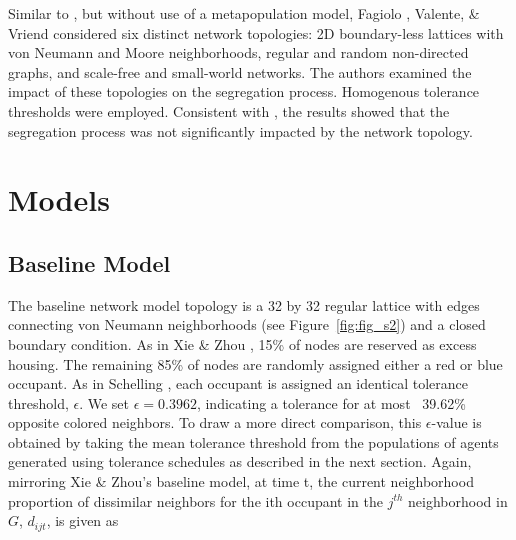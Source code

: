 \documentclass[a4paper]{article}
\begin{document}
Similar to \cite{GargiuloFloriana2015UsfS}, but without use of a metapopulation model, Fagiolo , Valente, \& Vriend \cite{FagioloGiorgio2007Sin} considered six distinct network topologies: 2D boundary-less lattices with von Neumann and Moore neighborhoods, regular and random non-directed graphs, and scale-free and small-world networks. The authors examined the impact of these topologies on the segregation process. Homogenous tolerance thresholds were employed. Consistent with \cite{GargiuloFloriana2015UsfS}, the results showed that the segregation process was not significantly impacted by the network topology.

\section{Models}

\subsection{Baseline Model}
The baseline network model topology is a 32 by 32 regular lattice with edges connecting von Neumann neighborhoods (see Figure~\ref*{fig:fig_s2}) and a closed boundary condition.  As in Xie \& Zhou \cite{xie2012modeling}, 15\% of nodes are reserved as excess housing.  The remaining 85\% of nodes are randomly assigned either a red or blue occupant.  As in Schelling \cite{schelling1971dynamic}, each occupant is assigned an identical tolerance threshold, $\epsilon$. We set $\epsilon=0.3962$, indicating a tolerance for at most ~39.62\% opposite colored neighbors. To draw a more direct comparison, this $\epsilon$-value is obtained by taking the mean tolerance threshold from the populations of agents generated using tolerance schedules as described in the next section. 
Again, mirroring Xie \& Zhou’s \cite{xie2012modeling} baseline model, at time t, the current neighborhood proportion of dissimilar neighbors for the ith occupant in the $j^{th}$ neighborhood in $G$, $d_{ijt}$, is given as
\end{document}
